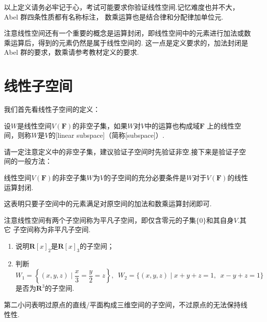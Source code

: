以上定义请务必牢记于心，考试可能要求你验证线性空间.记忆难度也并不大，Abel 群四条性质都有名称标注，
数乘运算也是结合律和分配律加单位元.

注意线性空间还有一个重要的概念是运算封闭，即线性空间中的元素进行加法或数乘运算后，得到的元素仍然是属于线性空间的.
这一点是定义要求的，加法封闭是 Abel 群的要求，数乘请参考教材定义的要求.

\section{线性子空间}
我们首先看线性子空间的定义：
\begin{definition}
    设$W$是线性空间$V(\mathbf{F})$的非空子集，如果$W$对$V$中的运算也构成域$\mathbf{F}$
    上的线性空间，则称$W$是$V$的[linear subspace]（简称[subspace]）.
\end{definition}
请一定注意定义中的非空子集，建议验证子空间时先验证非空.接下来是验证子空间的一般方法：
\begin{theorem}
    线性空间$V(\mathbf{F})$的非空子集$W$为$V$的子空间的充分必要条件是$W$对于$V(\mathbf{F})$的线性运算封闭.
\end{theorem}
这表明只要子空间中的元素满足对原空间的加法和数乘运算封闭即可.

注意线性空间有两个子空间称为平凡子空间，即仅含零元的子集$\{0\}$和其自身$V$.其它
子空间称为非平凡子空间.
\begin{example}
    \begin{enumerate}[label=(\arabic*)]
    \item 说明$\mathbf{R}[x]_2$是$\mathbf{R}[x]_3$的子空间；

    \item 判断$W_1=\left\{(x,y,z) \mid \dfrac{x}{3}=\dfrac{y}{2}=z\right\},\enspace
        W_2=\{(x,y,z) \mid x+y+z=1,\enspace x-y+z=1\}$是否为$\mathbf{R}^3$的子空间.
    \end{enumerate}
\end{example}
第二小问表明过原点的直线/平面构成三维空间的子空间，不过原点的无法保持线性性.


